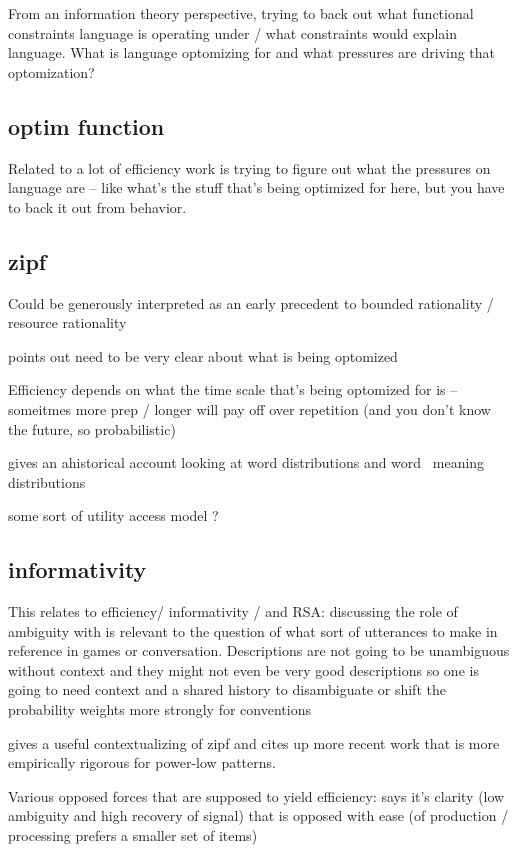 \documentclass[]{article}
\begin{document}
\cite{futrell2022} From an information theory perspective, trying to back out what functional constraints language is operating under / what constraints would explain language. What is language optomizing for and what pressures are driving that optomization? 
\subsection{optim function}

Related to a lot of efficiency work is trying to figure out what the pressures on language are -- like what's the stuff that's being optimized for here, but you have to back it out from behavior. 


\subsection{zipf}
Could be generously interpreted as an early precedent to bounded rationality / resource rationality 

points out need to be very clear about what is being optomized

Efficiency depends on what the time scale that's being optomized for is -- someitmes more prep / longer will pay off over repetition (and you don't know the future, so probabilistic)

gives an ahistorical account looking at word distributions and word \ meaning distributions 

some sort of utility access model ? 


\subsection{informativity}

This relates to efficiency/ informativity / and RSA: \cite{piantadosi2012} discussing the role of ambiguity with is relevant to the question of what sort of utterances to make in reference in games or conversation. Descriptions are not going to be unambiguous without context and they might not even be very good descriptions so one is going to need context and a shared history to disambiguate or shift the probability weights more strongly for conventions

\cite{piantadosi2012} gives a useful contextualizing of zipf and cites up more recent work that is more empirically rigorous for power-low patterns. 

Various opposed forces that are supposed to yield efficiency: \cite{piantadosi2012} says it's clarity (low ambiguity and high recovery of signal) that is opposed with ease (of production / processing prefers a smaller set of items) 
\end{document}
